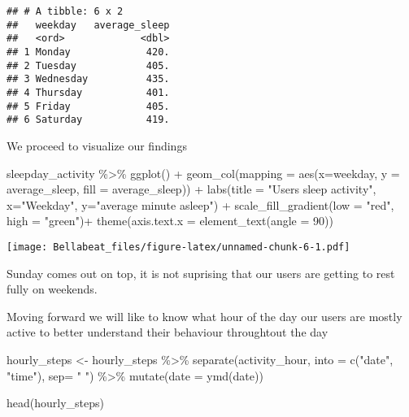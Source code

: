 \documentclass[
]{article}
\newenvironment{Shaded}{\begin{snugshade}}{\end{snugshade}}
\newcommand{\AttributeTok}[1]{\textcolor[rgb]{0.77,0.63,0.00}{#1}}
\newcommand{\DecValTok}[1]{\textcolor[rgb]{0.00,0.00,0.81}{#1}}
\newcommand{\FunctionTok}[1]{\textcolor[rgb]{0.00,0.00,0.00}{#1}}
\newcommand{\NormalTok}[1]{#1}
\newcommand{\OtherTok}[1]{\textcolor[rgb]{0.56,0.35,0.01}{#1}}
\newcommand{\SpecialCharTok}[1]{\textcolor[rgb]{0.00,0.00,0.00}{#1}}
\newcommand{\StringTok}[1]{\textcolor[rgb]{0.31,0.60,0.02}{#1}}
\begin{document}
\begin{verbatim}
## # A tibble: 6 x 2
##   weekday   average_sleep
##   <ord>             <dbl>
## 1 Monday             420.
## 2 Tuesday            405.
## 3 Wednesday          435.
## 4 Thursday           401.
## 5 Friday             405.
## 6 Saturday           419.
\end{verbatim}

We proceed to visualize our findings

\begin{Shaded}
\begin{Highlighting}[]
\NormalTok{sleepday\_activity }\SpecialCharTok{\%\textgreater{}\%}
  \FunctionTok{ggplot}\NormalTok{() }\SpecialCharTok{+}
  \FunctionTok{geom\_col}\NormalTok{(}\AttributeTok{mapping =} \FunctionTok{aes}\NormalTok{(}\AttributeTok{x=}\NormalTok{weekday, }\AttributeTok{y =}\NormalTok{ average\_sleep, }\AttributeTok{fill =}\NormalTok{ average\_sleep)) }\SpecialCharTok{+} 
  \FunctionTok{labs}\NormalTok{(}\AttributeTok{title =} \StringTok{"Users sleep activity"}\NormalTok{, }\AttributeTok{x=}\StringTok{"Weekday"}\NormalTok{, }\AttributeTok{y=}\StringTok{"average minute asleep"}\NormalTok{) }\SpecialCharTok{+} 
  \FunctionTok{scale\_fill\_gradient}\NormalTok{(}\AttributeTok{low =} \StringTok{"red"}\NormalTok{, }\AttributeTok{high =} \StringTok{"green"}\NormalTok{)}\SpecialCharTok{+}
  \FunctionTok{theme}\NormalTok{(}\AttributeTok{axis.text.x =} \FunctionTok{element\_text}\NormalTok{(}\AttributeTok{angle =} \DecValTok{90}\NormalTok{))}
\end{Highlighting}
\end{Shaded}

\texttt{[image: Bellabeat\_files/figure-latex/unnamed-chunk-6-1.pdf]}

Sunday comes out on top, it is not suprising that our users are getting
to rest fully on weekends.

Moving forward we will like to know what hour of the day our users are
mostly active to better understand their behaviour throughtout the day

\begin{Shaded}
\begin{Highlighting}[]
\NormalTok{hourly\_steps }\OtherTok{\textless{}{-}}\NormalTok{ hourly\_steps }\SpecialCharTok{\%\textgreater{}\%}
  \FunctionTok{separate}\NormalTok{(activity\_hour, }\AttributeTok{into =} \FunctionTok{c}\NormalTok{(}\StringTok{"date"}\NormalTok{, }\StringTok{"time"}\NormalTok{), }\AttributeTok{sep=} \StringTok{" "}\NormalTok{) }\SpecialCharTok{\%\textgreater{}\%}
  \FunctionTok{mutate}\NormalTok{(}\AttributeTok{date =} \FunctionTok{ymd}\NormalTok{(date)) }

\FunctionTok{head}\NormalTok{(hourly\_steps)}
\end{Highlighting}
\end{Shaded}
\end{document}
